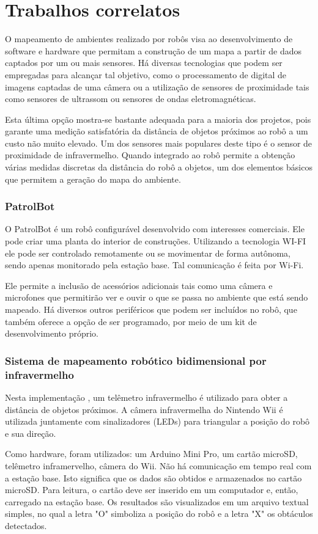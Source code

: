 \chapter{Trabalhos correlatos}

O mapeamento de ambientes realizado por robôs visa ao desenvolvimento de software e hardware que permitam a construção de um mapa a partir de dados captados por um ou mais sensores. Há diversas tecnologias que podem ser empregadas para alcançar tal objetivo, como o processamento de digital de imagens captadas de uma câmera ou a utilização de sensores de proximidade tais como sensores de ultrassom ou sensores de ondas eletromagnéticas.

Esta última opção mostra-se bastante adequada para a maioria dos projetos, pois garante uma medição satisfatória da distância de objetos próximos ao robô a um custo não muito elevado. Um dos sensores mais populares deste tipo é o sensor de proximidade de infravermelho. Quando integrado ao robô permite a obtenção várias medidas discretas da distância do robô a objetos, um dos elementos básicos que permitem a geração do mapa do ambiente.

\subsection{PatrolBot}
O PatrolBot \cite{patrol_bot} é um robô configurável desenvolvido com interesses comerciais. Ele pode criar uma planta do interior de construções. Utilizando a tecnologia WI-FI ele pode ser controlado remotamente ou se movimentar de forma autônoma, sendo apenas monitorado pela estação base. Tal comunicação é feita por Wi-Fi.

Ele permite a inclusão de acessórios adicionais tais como uma câmera e microfones que permitirão ver e ouvir o que se passa no ambiente que está sendo mapeado. Há diversos outros periféricos que podem ser incluídos no robô, que também oferece a opção de ser programado, por meio de um kit de desenvolvimento próprio.

\subsection{Sistema de mapeamento robótico bidimensional por infravermelho}

Nesta implementação \cite{wii}, um telêmetro infravermelho é utilizado para obter a distância de objetos próximos. A câmera infravermelha do Nintendo Wii é utilizada juntamente com sinalizadores (LEDs) para triangular a posição do robô e sua direção.

Como hardware, foram utilizados: um Arduino Mini Pro, um cartão microSD, telêmetro inframervelho, câmera do Wii. Não há comunicação em tempo real com a estação base. Isto significa que os dados são obtidos e armazenados no cartão microSD. Para leitura, o cartão deve ser inserido em um computador e, então, carregado na estação base. Os resultados são visualizados em um arquivo textual simples, no qual a letra "O" simboliza a posição do robô e a letra "X" os obtáculos detectados.
